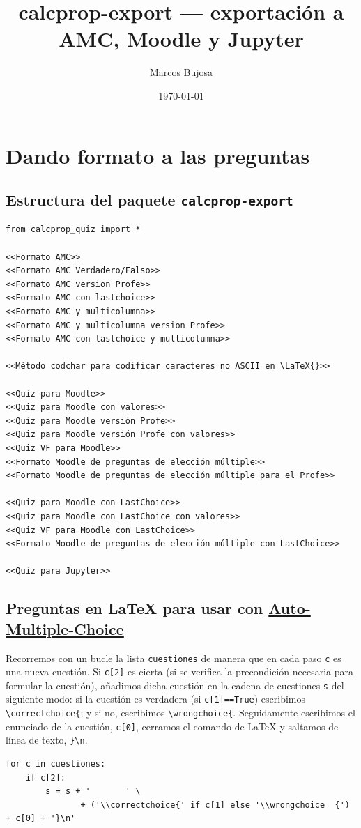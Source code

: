 \documentclass[10pt,a4paper]{report}
\author{Marcos Bujosa}
\date{\today}
\title{calcprop-export — exportación a AMC, Moodle y Jupyter}
\begin{document}
\tableofcontents

\part{Dando formato a las preguntas}
\label{sec:org6fb95f7}

\chapter{Estructura del paquete \texttt{calcprop-export}}
\label{sec:org877216f}

\begin{verbatim}
from calcprop_quiz import *

<<Formato AMC>>
<<Formato AMC Verdadero/Falso>>
<<Formato AMC version Profe>>
<<Formato AMC con lastchoice>>
<<Formato AMC y multicolumna>>
<<Formato AMC y multicolumna version Profe>>
<<Formato AMC con lastchoice y multicolumna>>

<<Método codchar para codificar caracteres no ASCII en \LaTeX{}>>

<<Quiz para Moodle>>
<<Quiz para Moodle con valores>>
<<Quiz para Moodle versión Profe>>
<<Quiz para Moodle versión Profe con valores>>
<<Quiz VF para Moodle>>
<<Formato Moodle de preguntas de elección múltiple>>
<<Formato Moodle de preguntas de elección múltiple para el Profe>>

<<Quiz para Moodle con LastChoice>>
<<Quiz para Moodle con LastChoice con valores>>
<<Quiz VF para Moodle con LastChoice>>
<<Formato Moodle de preguntas de elección múltiple con LastChoice>>

<<Quiz para Jupyter>>

\end{verbatim}
\chapter{Preguntas en \LaTeX{} para usar con \href{https://www.auto-multiple-choice.net/}{Auto-Multiple-Choice}}
\label{sec:org9e98c1e}

Recorremos con un bucle la lista \texttt{cuestiones} de manera que en cada paso \texttt{c} es una nueva cuestión.
Si \texttt{c[2]} es cierta (si se verifica la precondición necesaria para formular la cuestión),
añadimos dicha cuestión en la cadena de cuestiones \texttt{s} del siguiente modo:
si la cuestión es verdadera (si \texttt{c[1]==True}) escribimos \texttt{\textbackslash{}correctchoice\{}; y si no, escribimos \texttt{\textbackslash{}wrongchoice\{}.
Seguidamente escribimos el enunciado de la cuestión, \texttt{c[0]}, cerramos el comando de \LaTeX{} y saltamos de línea de texto, \texttt{\}\textbackslash{}n}.
\begin{verbatim}
for c in cuestiones:
    if c[2]:
        s = s + '       ' \
               + ('\\correctchoice{' if c[1] else '\\wrongchoice  {') + c[0] + '}\n'
\end{verbatim}
\end{document}
